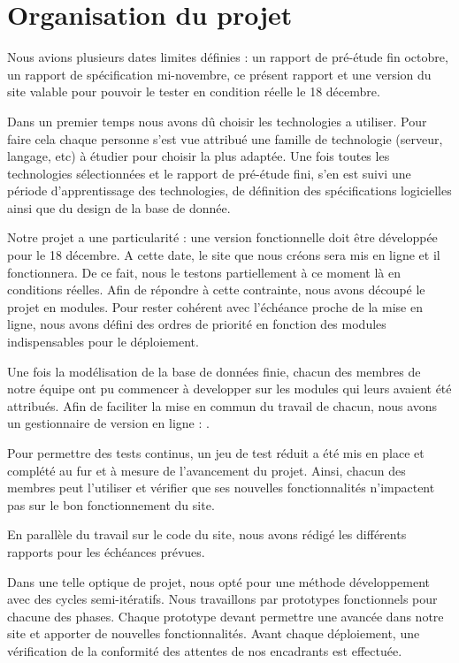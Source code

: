\chapter{Organisation du projet}

Nous avions plusieurs dates limites définies : un rapport de pré-étude fin octobre, un rapport de spécification mi-novembre, ce présent rapport et une version du site valable pour pouvoir le tester en condition réelle le 18 décembre.

Dans un premier temps nous avons dû choisir les technologies a utiliser. Pour faire cela chaque personne s'est vue attribué une famille de technologie (serveur, langage, etc) à étudier pour choisir la plus adaptée.
Une fois toutes les technologies sélectionnées et le rapport de pré-étude fini, s'en est suivi une période d'apprentissage des technologies, de définition des spécifications logicielles ainsi que du design de la base de donnée.

Notre projet a une particularité : une version fonctionnelle doit être développée pour le 18 décembre. A cette date, le site que nous créons sera mis en ligne et il fonctionnera. De ce fait, nous le testons partiellement à ce moment là en conditions réelles. Afin de répondre à cette contrainte, nous avons découpé le projet en modules. Pour rester cohérent avec l'échéance proche de la mise en ligne, nous avons défini des ordres de priorité en fonction des modules indispensables pour le déploiement.

Une fois la modélisation de la base de données finie, chacun des membres de notre équipe ont pu commencer à developper sur les modules qui leurs avaient été attribués. Afin de faciliter la mise en commun du travail de chacun, nous avons un gestionnaire de version en ligne : \git.

Pour permettre des tests continus, un jeu de test réduit a été mis en place et complété au fur et à mesure de l'avancement du projet. Ainsi, chacun des membres peut l'utiliser et vérifier que ses nouvelles fonctionnalités n'impactent pas sur le bon fonctionnement du site.

En parallèle du travail sur le code du site, nous avons rédigé les différents rapports pour les échéances prévues.

Dans une telle optique de projet, nous opté pour une méthode développement avec des cycles semi-itératifs. Nous travaillons par prototypes fonctionnels pour chacune des phases. Chaque prototype devant permettre une avancée dans notre site et apporter de nouvelles fonctionnalités. Avant chaque déploiement, une vérification de la conformité des attentes de nos encadrants est effectuée.